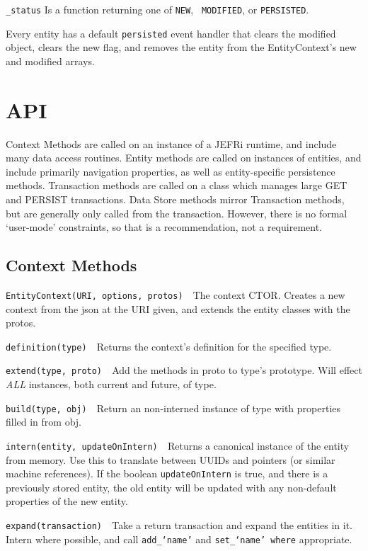 \documentclass{article}
\newcommand{\ilcode}{\tt}
\begin{document}
{\ilcode \_status} Is a function returning one of {\ilcode NEW}, {\ilcode
MODIFIED}, or {\ilcode PERSISTED}.

Every entity has a default {\ilcode persisted} event handler that clears the
modified object, clears the new flag, and removes the entity from the
EntityContext's new and modified arrays.

\section{API}
Context Methods are called on an instance of a JEFRi runtime, and include many
data access routines. Entity methods are called on instances of entities, and
include primarily navigation properties, as well as entity-specific persistence
methods. Transaction methods are called on a class which manages large GET and
PERSIST transactions. Data Store methods mirror Transaction methods, but
are generally only called from the transaction. However, there is no formal
`user-mode' constraints, so that is a recommendation, not a requirement.

\subsection{Context Methods}
	{\ilcode EntityContext(URI, options, protos) }\
		The context CTOR. Creates a new context from the json at the URI given,
		and extends the entity classes with the protos.

	{\ilcode definition(type) }\
		Returns the context's definition for the specified type.

	{\ilcode extend(type, proto) }\
		Add the methods in proto to type's prototype. Will effect {\it ALL}
		instances, both current and future, of type.

	{\ilcode build(type, obj) }\
		Return an non-interned instance of type with properties filled in from
		obj.

	{\ilcode intern(entity, updateOnIntern) }\
		Returns a canonical instance of the entity from memory. Use this to
		translate between UUIDs and pointers (or similar machine references). If
		the boolean {\ilcode updateOnIntern} is true, and there is a previously
		stored entity, the old entity will be updated with any non-default
		properties of the new entity.

	{\ilcode expand(transaction) }\
		Take a return transaction and expand the entities in it. Intern where
		possible, and call {\ilcode add\_`name'} and {\ilcode set\_`name' where}
		appropriate.
\end{document}
